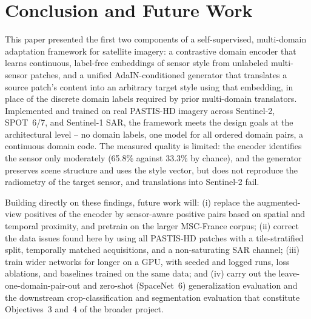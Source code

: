 \documentclass[runningheads]{llncs}
\begin{document}
\section{Conclusion and Future Work}
This paper presented the first two components of a self-supervised, multi-domain adaptation framework for satellite imagery: a contrastive domain encoder that learns continuous, label-free embeddings of sensor style from unlabeled multi-sensor patches, and a unified AdaIN-conditioned generator that translates a source patch's content into an arbitrary target style using that embedding, in place of the discrete domain labels required by prior multi-domain translators. Implemented and trained on real PASTIS-HD imagery across Sentinel-2, SPOT~6/7, and Sentinel-1 SAR, the framework meets the design goals at the architectural level -- no domain labels, one model for all ordered domain pairs, a continuous domain code. The measured quality is limited: the encoder identifies the sensor only moderately (65.8\% against 33.3\% by chance), and the generator preserves scene structure and uses the style vector, but does not reproduce the radiometry of the target sensor, and translations into Sentinel-2 fail.

Building directly on these findings, future work will: (i) replace the augmented-view positives of the encoder by sensor-aware positive pairs based on spatial and temporal proximity, and pretrain on the larger MSC-France corpus; (ii) correct the data issues found here by using all PASTIS-HD patches with a tile-stratified split, temporally matched acquisitions, and a non-saturating SAR channel; (iii) train wider networks for longer on a GPU, with seeded and logged runs, loss ablations, and baselines trained on the same data; and (iv) carry out the leave-one-domain-pair-out and zero-shot (SpaceNet~6) generalization evaluation and the downstream crop-classification and segmentation evaluation that constitute Objectives~3 and~4 of the broader project.



\end{document}
